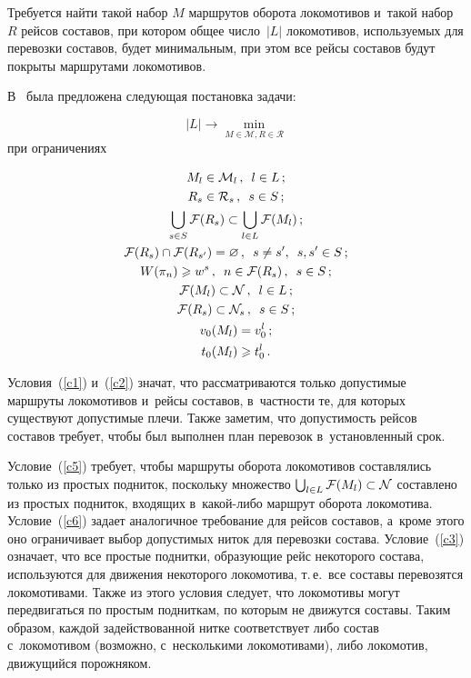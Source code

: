\begin{multicols}{2}
Требуется найти такой набор $M$ маршрутов оборота локомотивов и~такой набор~$R$ 
рейсов составов, при котором общее число~$|L|$ локомотивов, используемых 
для перевозки составов, будет минимальным, при этом все рейсы 
составов будут покрыты маршрутами локомотивов.
    
В~\cite{AzanovBuyanov} была предложена следующая постановка задачи:

\noindent
\begin{equation}
    \label{problem_main}
    |L| \to \min_{M\in \mathcal M, R\in\mathcal R}
\end{equation}
    при ограничениях
    
    \noindent
\begin{gather}
        M_{l}\in\mathcal M_l\,,\enskip l\in L\,;    \label{c1}\\
    \label{c2}
        R_s \in \mathcal R_s\,,\enskip s\in S\,;\\
    \label{c3}
           \bigcup\limits_{s\in S} \mathcal F(R_s) \subset \bigcup\limits_{l\in L} \mathcal F(M_l)\,;\\
    \label{c4}
        \mathcal F(R_s)\cap \mathcal F(R_{s'}) = \varnothing\,, 
        \enskip s \ne s', \enskip s, s'\in S\,;\\
    \label{cadd1}
        W(\pi_n)\geqslant w^s\,,\enskip n\in\mathcal F(R_s)\,,\enskip s\in S\,;\\
    \label{c5}
        \mathcal F(M_l) \subset \mathcal N\,,\enskip l \in L\,;\\
    \label{c6}
        \mathcal F(R_s) \subset \mathcal N_s\,,\enskip s\in S\,;\\
    \label{c7}
        v_0(M_l) = v_0^l\,;\\
    \label{c8}
        t_0(M_l) \geqslant t_0^l\,.
\end{gather}

Условия~(\ref{c1}) и~(\ref{c2}) значат, что рассматриваются только допустимые 
маршруты локомотивов и~рейсы составов, в~частности те, для которых 
существуют допустимые плечи. Также заметим, что допустимость 
рейсов составов требует, чтобы был выполнен план перевозок в~установленный срок.

Условие~(\ref{c5}) требует, чтобы маршруты оборота локомотивов составлялись 
только из простых подниток, поскольку множество $\bigcup\nolimits_{l\in L} 
\mathcal F(M_l)\hm \subset \mathcal N$ со\-став\-ле\-но из простых подниток, 
входящих в~ка\-кой-ли\-бо маршрут оборота локомотива. Условие~(\ref{c6})\linebreak 
задает аналогичное требование для рейсов составов, а~кроме этого оно 
ограничивает выбор допустимых ниток для перевозки состава. Условие~(\ref{c3}) 
означает, что все простые поднитки, образующие рейс некоторого состава, 
используются для движения некоторого локомотива, т.\,е.\
 все составы перевозятся локомотивами. Также из этого условия 
 следует, что локомотивы могут передвигаться по простым подниткам, 
 по которым не движутся составы. Таким образом, каждой задействованной 
 нитке со\-от\-вет\-ст\-ву\-ет либо состав с~локомотивом (возможно, 
 с~несколькими локомотивами), либо локомотив, движущийся порожняком.


\end{multicols}
